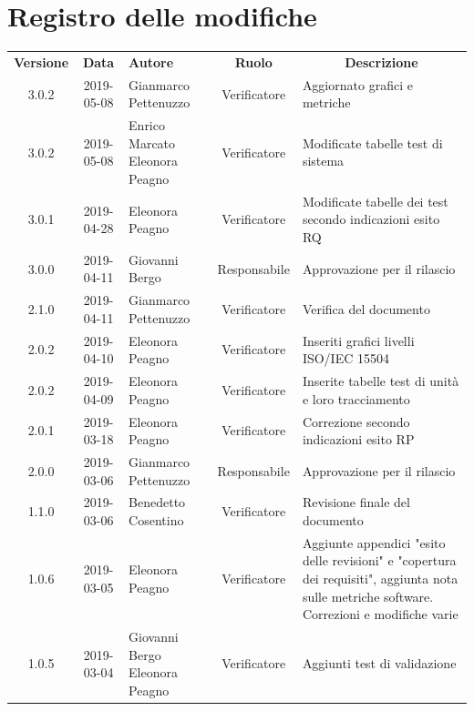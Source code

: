 \documentclass[11pt,a4paper]{article}
\begin{document}
	
	\newpage
	{\def\arraystretch{2}\tabcolsep=10pt
	
	\section*{\centering Registro delle modifiche}
	\begin{tabularx}{\textwidth}{ c | c | p{3.5cm} | c | X }
		\rowcolor{LightBlue}
		\color{white}\bfseries Versione & \color{white}\bfseries Data & \color{white}\bfseries Autore & \color{white}\bfseries Ruolo & \multicolumn{1}{c}{\color{white}\bfseries Descrizione}\\[0.25cm]
		3.0.2 & 2019-05-08 & Gianmarco Pettenuzzo & Verificatore & Aggiornato grafici e metriche \\ \hline
		3.0.2 & 2019-05-08 & Enrico Marcato \newline Eleonora Peagno & Verificatore & Modificate tabelle test di sistema \\ \hline
		3.0.1 & 2019-04-28 & Eleonora Peagno & Verificatore & Modificate tabelle dei test secondo indicazioni esito RQ \\ \hline
		3.0.0 & 2019-04-11 & Giovanni Bergo & Responsabile & Approvazione per il rilascio \\ \hline
		2.1.0 & 2019-04-11 & Gianmarco Pettenuzzo & Verificatore & Verifica del documento \\ \hline
		2.0.2 & 2019-04-10 & Eleonora Peagno & Verificatore & Inseriti grafici livelli ISO/IEC 15504 \\ \hline
		2.0.2 & 2019-04-09 & Eleonora Peagno & Verificatore & Inserite tabelle test di unità e loro tracciamento \\ \hline
		2.0.1 & 2019-03-18 & Eleonora Peagno & Verificatore & Correzione secondo indicazioni esito RP \\ \hline
		2.0.0 & 2019-03-06 & Gianmarco Pettenuzzo & Responsabile & Approvazione per il rilascio \\ \hline
		1.1.0 & 2019-03-06 & Benedetto Cosentino & Verificatore & Revisione finale del documento \\ \hline
		1.0.6 & 2019-03-05 & Eleonora Peagno & Verificatore & Aggiunte appendici "esito delle revisioni" e "copertura dei requisiti", aggiunta nota sulle metriche software. Correzioni e modifiche varie \\ \hline
		1.0.5 & 2019-03-04 & Giovanni Bergo \newline Eleonora Peagno & Verificatore & Aggiunti test di validazione \\ \hline

\end{tabularx}}
\end{document}
